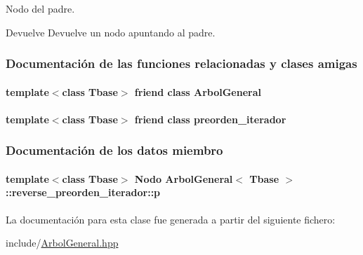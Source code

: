Nodo del padre. 

\begin{DoxyReturn}{Devuelve}
Devuelve un nodo apuntando al padre. 
\end{DoxyReturn}


\subsubsection{Documentación de las funciones relacionadas y clases amigas}
\hypertarget{classArbolGeneral_1_1reverse__preorden__iterador_a9c06e31b7c3e0d4ee5b03003d32935a5}{
\paragraph[{Arbol\-General}]{\setlength{\rightskip}{0pt plus 5cm}template$<$class Tbase$>$ friend class {\bf Arbol\-General}\hspace{0.3cm}{\ttfamily [friend]}}}\label{classArbolGeneral_1_1reverse__preorden__iterador_a9c06e31b7c3e0d4ee5b03003d32935a5}
\hypertarget{classArbolGeneral_1_1reverse__preorden__iterador_a4aa0da8bfbc320a8daff98451ee65b6c}{
\paragraph[{preorden\-\_\-iterador}]{\setlength{\rightskip}{0pt plus 5cm}template$<$class Tbase$>$ friend class {\bf preorden\-\_\-iterador}\hspace{0.3cm}{\ttfamily [friend]}}}\label{classArbolGeneral_1_1reverse__preorden__iterador_a4aa0da8bfbc320a8daff98451ee65b6c}


\subsubsection{Documentación de los datos miembro}
\hypertarget{classArbolGeneral_1_1reverse__preorden__iterador_a002862fdee453a84b037e5dd26c071a2}{
\paragraph[{p}]{\setlength{\rightskip}{0pt plus 5cm}template$<$class Tbase$>$ {\bf Nodo} {\bf Arbol\-General}$<$ Tbase $>$\-::reverse\-\_\-preorden\-\_\-iterador\-::p\hspace{0.3cm}{\ttfamily [private]}}}\label{classArbolGeneral_1_1reverse__preorden__iterador_a002862fdee453a84b037e5dd26c071a2}


La documentación para esta clase fue generada a partir del siguiente fichero\-:\begin{DoxyCompactItemize}
\item 
include/\hyperlink{ArbolGeneral_8hpp}{Arbol\-General.\-hpp}\end{DoxyCompactItemize}
